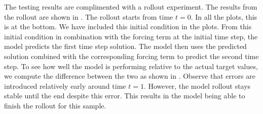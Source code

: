 The testing results are complimented with a rollout experiment. The results from the rollout are shown in . The rollout starts from time \(t=0\). In all the plots, this is at the bottom. We have included this initial condition in the plots. From this initial condition in combination with the forcing term at the initial time step, the model predicts the first time step solution. The model then uses the predicted solution combined with the corresponding forcing term to predict the second time step. To see how well the model is performing relative to the actual target values, we compute the difference between the two as shown in . Observe that errors are introduced relatively early around time \(t=1\). However, the model rollout stays stable until the end despite this error. This results in the model being able to finish the rollout for this sample.
